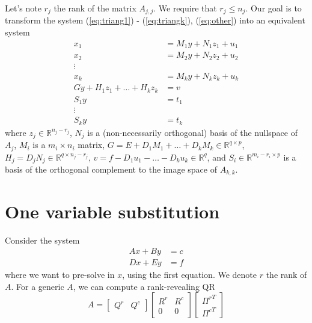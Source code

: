 \documentclass[]{article}
\theoremstyle{definition}
\newcommand{\BIN}{\begin{bmatrix}}
\newcommand{\BOUT}{\end{bmatrix}}
\begin{document}
Let's note $r_j$ the rank of the matrix $A_{j,j}$. We require that $r_j \leq n_j$.
Our goal is to transform the system (\ref{eq:triang1}) - (\ref{eq:triangk}), (\ref{eq:other}) into an equivalent system
\begin{align}
  x_1 &= M_1 y + N_1 z_1 + u_1 \\
	x_2 &= M_2 y + N_2 z_2 + u_2 \\
  \vdots & \nonumber \\
	x_k &= M_k y + N_k z_k + u_k \\
	G y + H_1 z_1 + \ldots + H_k z_k &= v \\
	S_1 y &= t_1 \\
	\vdots \nonumber \\
	S_k y &= t_k
\end{align}
where $z_j \in \mathbb{R}^{n_j-r_j}$, $N_j$ is a (non-necessarily orthogonal) basis of the nullspace of $A_j$, $M_i$ is a $m_i \times n_i$ matrix, $G = E + D_1 M_1 + \ldots + D_k M_k \in \mathbb{R}^{q\times p}$, $H_j = D_j N_j \in \mathbb{R}^{q\times n_j-r_j}$, $v = f - D_1 u_1 - \ldots - D_k u_k \in \mathbb{R}^q$, and $S_i \in \mathbb{R}^{m_i-r_i \times p}$ is a basis of the orthogonal complement to the image space of $A_{k,k}$.


\section{One variable substitution}
Consider the system
\begin{align}
	A x + B y &= c \label{eq:simple1}\\
	D x + E y &= f \label{eq:simple2}
\end{align}
where we want to pre-solve in $x$, using the first equation. We denote $r$ the rank of $A$. For a generic $A$, we can compute a rank-revealing QR
\begin{equation}
	A = \BIN Q^r & Q^c \BOUT \BIN R^r & R^c \\ 0 & 0 \BOUT \BIN {\Pi^r}^T \\ {\Pi^c}^T \BOUT
\end{equation}
\end{document}

